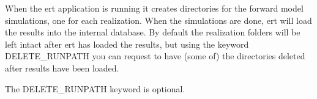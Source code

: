 \documentclass[a4paper,10pt,english]{sphinxmanual}
\begin{document}
\begin{sphinxShadowBox}

When the ert application is running it creates directories for
the forward model simulations, one for each realization. When
the simulations are done, ert will load the results into the
internal database. By default the realization folders will be
left intact after ert has loaded the results, but using the
keyword DELETE\_RUNPATH you can request to have (some of) the
directories deleted after results have been loaded.


%
\begin{sphinxVerbatim}[commandchars=\\\{\}]
      
 
\end{sphinxVerbatim}


%
\begin{sphinxVerbatim}[commandchars=\\\{\}]
             
      
\end{sphinxVerbatim}

The DELETE\_RUNPATH keyword is optional.
\end{sphinxShadowBox}
\label{\detokenize{keywords/index:end-date}}
\end{document}
